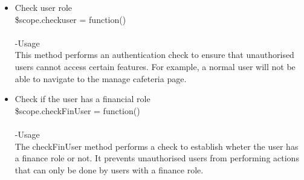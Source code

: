 \documentclass[a4paper,12pt]{article}
\begin{document}
\begin{enumerate}
\begin{itemize}
\item Check user role\\
 \$scope.checkuser = function()\\ \\
-Usage\\
This method performs an authentication check to ensure that unauthorised users cannot access certain features. For example, a normal user will not be able to navigate to the manage cafeteria page.

\item Check if the user has a financial role\\
 \$scope.checkFinUser = function()\\ \\
-Usage\\
The checkFinUser method performs a check to establish wheter the user has a finance role or not. It prevents unauthorised users from performing actions that can only be done by users with a finance role.
	\end{itemize}
 \end{enumerate}
\end{document}
